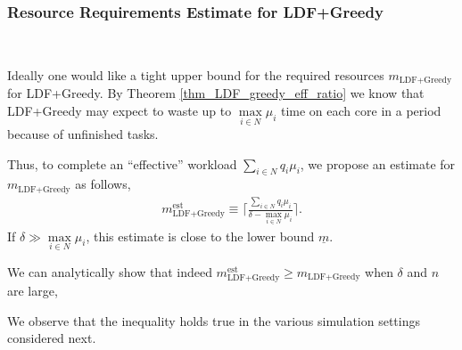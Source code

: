 \documentclass[prodmode,acmtompecs]{acmsmall}
\newcommand{\reqvec}{\mathbf{q}}
\newcommand{\reqscalar}{q}
\newcommand{\fullUserSet}{N}
\newcommand{\myComments}[1]{}
\newif\ifinfocom
\newif\iftompecsonly
\newif\iftompecsextended
\newif\ifdissertation
\newcommand{\infocomStart}{\ifinfocom \myComments{Infocom: }}
\newcommand{\tompecsonlyStart}{\iftompecsonly \myComments{TOMPECS only version: }}
\newcommand{\tompecsextendedStart}{\iftompecsextended  \myComments{TOMPECS extended version: }}
\newcommand{\dissertationStart}{\ifdissertation  \myComments{Dissertation version: }}
\newcommand{\commentEnd}{\myComments{End}}
\begin{document}
\dissertationStart
If we ignore the ceilings, 
\begin{align}
\label{align_m_savings}
1 - \frac{\underline{m}}{m_{\text{RB}}} \simeq 1 - \frac{\sum\limits_{i\in \fullUserSet} \reqscalar_i \mu_i}{\sum\limits_{i\in \fullUserSet}w_i(q_i)}
\end{align}
gives us a {\em upper bound} for the possible resource savings compared with reservation-based static sharing, i.e., the percentage of cores we can save by devising the best possible non-clairvoyant resource allocation policies. Clearly, this depends on the workload distributions and the requirement vector $\reqvec$. We will see in the simulation section that the proposed approaches can achieve this upper bound in some scenarios. 
\commentEnd\fi

\subsubsection{Resource Requirements Estimate for LDF+Greedy}
~

\dissertationStart
After giving a the lower bound $\underline{m}$ for the required number of cores for all non-clairvoyant designs, we want to explore the required $m_{\text{LDF+Greedy}}$ for the LDF+Greedy policy. 
\commentEnd\fi
Ideally one would like a tight upper bound for the required resources $m_{\text{LDF+Greedy}}$ for LDF+Greedy. 
By Theorem \ref{thm_LDF_greedy_eff_ratio} we know that LDF+Greedy may expect to waste up to $\max\limits_{i \in \fullUserSet} \mu_i$ time on each core in a period because of unfinished tasks. 
\dissertationStart
Therefore, the ``effective'' time for each core in one period is at least $\delta - \max\limits_{i \in \fullUserSet} \mu_i$. 
\commentEnd\fi
Thus, to complete an ``effective'' workload $\sum\limits_{i\in \fullUserSet} \reqscalar_i \mu_i$, we propose an estimate for $m_{\text{LDF+Greedy}}$ as follows,
\begin{align}
\label{align_m_LDF_greedy_est}
m_{\text{LDF+Greedy}}^\text{est} \equiv \Big\lceil \frac{\sum\limits_{i\in \fullUserSet} \reqscalar_i \mu_i}{\delta -\max\limits_{i \in \fullUserSet} \mu_i } \Big\rceil. 
\end{align}
If $\delta \gg \max\limits_{i\in \fullUserSet}\mu_i$, this estimate is close to the lower bound $\underline{m}$. 


\infocomStart
One can analytically show that indeed $m_{\text{LDF+Greedy}}^\text{est} \geq m_{\text{LDF+Greedy}}$ when $\delta$ and $n$ are large, see the extended version of this paper \cite{EXT}. 
\commentEnd\fi
We can analytically show that indeed $m_{\text{LDF+Greedy}}^\text{est} \geq m_{\text{LDF+Greedy}}$ when $\delta$ and $n$ are large, 
\tompecsonlyStart
see the extended version of this paper \cite{EXT}. 
\commentEnd\fi
\tompecsextendedStart
see the proposition as follows. 
\commentEnd\fi
We observe that the inequality holds true in the various simulation settings considered next. 
\end{document}

